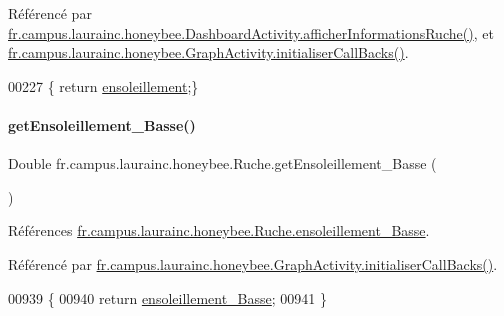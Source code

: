 Référencé par \hyperlink{classfr_1_1campus_1_1laurainc_1_1honeybee_1_1_dashboard_activity_a88f00531bee33bd6c47b33f5ac4df9ed}{fr.\+campus.\+laurainc.\+honeybee.\+Dashboard\+Activity.\+afficher\+Informations\+Ruche()}, et \hyperlink{classfr_1_1campus_1_1laurainc_1_1honeybee_1_1_graph_activity_a8dc56c3e0744bcb9295ad10e726b5fdb}{fr.\+campus.\+laurainc.\+honeybee.\+Graph\+Activity.\+initialiser\+Call\+Backs()}.


\begin{DoxyCode}
00227 \{ \textcolor{keywordflow}{return} \hyperlink{classfr_1_1campus_1_1laurainc_1_1honeybee_1_1_ruche_aebfc51ed0e12be0dddc7675884a8129b}{ensoleillement};\}
\end{DoxyCode}
\mbox{\label{classfr_1_1campus_1_1laurainc_1_1honeybee_1_1_ruche_ac7c7998ec56bfc71b6f1a240aec67cbc}} 
\paragraph{\texorpdfstring{get\+Ensoleillement\+\_\+\+Basse()}{getEnsoleillement\_Basse()}}
{\footnotesize\ttfamily Double fr.\+campus.\+laurainc.\+honeybee.\+Ruche.\+get\+Ensoleillement\+\_\+\+Basse (\begin{DoxyParamCaption}{ }\end{DoxyParamCaption})}



Références \hyperlink{classfr_1_1campus_1_1laurainc_1_1honeybee_1_1_ruche_a715ecfaedd6f31a078667e7f67348666}{fr.\+campus.\+laurainc.\+honeybee.\+Ruche.\+ensoleillement\+\_\+\+Basse}.



Référencé par \hyperlink{classfr_1_1campus_1_1laurainc_1_1honeybee_1_1_graph_activity_a8dc56c3e0744bcb9295ad10e726b5fdb}{fr.\+campus.\+laurainc.\+honeybee.\+Graph\+Activity.\+initialiser\+Call\+Backs()}.


\begin{DoxyCode}
00939                                             \{
00940         \textcolor{keywordflow}{return} \hyperlink{classfr_1_1campus_1_1laurainc_1_1honeybee_1_1_ruche_a715ecfaedd6f31a078667e7f67348666}{ensoleillement\_Basse};
00941     \}
\end{DoxyCode}
\mbox{\label{classfr_1_1campus_1_1laurainc_1_1honeybee_1_1_ruche_a0b0953f30bc0fff703abff84d55c696b}} 
